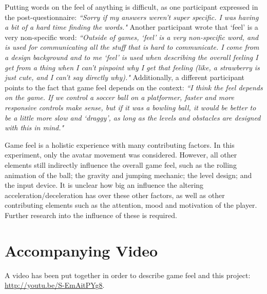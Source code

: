 Putting words on the feel of anything is difficult, as one participant expressed in the post-questionnaire: \textit{``Sorry if my answers weren't super specific. I was having a bit of a hard time finding the words."} Another participant wrote that `feel' is a very non-specific word: \textit{``Outside of games, `feel' is a very non-specific word, and is used for communicating all the stuff that is hard to communicate. I come from a design background and to me `feel' is used when describing the overall feeling I get from a thing when I can't pinpoint why I get that feeling (like, a strawberry is just cute, and I can't say directly why)."} Additionally, a different participant points to the fact that game feel depends on the context: \textit{``I think the feel depends on the game. If we control a soccer ball on a platformer, faster and more responsive controls make sense, but if it was a bowling ball, it would be better to be a little more slow and `draggy', as long as the levels and obstacles are designed with this in mind."}

Game feel is a holistic experience with many contributing factors. In this experiment, only the avatar movement was considered. However, all other elements still indirectly influence the overall game feel, such as the rolling animation of the ball; the gravity and jumping mechanic; the level design; and the input device. It is unclear how big an influence the altering acceleration/deceleration has over these other factors, as well as other contributing elements such as the attention, mood and motivation of the player. Further research into the influence of these is required.

\section{Accompanying Video}
A video has been put together in order to describe game feel and this project: \url{http://youtu.be/S-EmAitPYg8}.